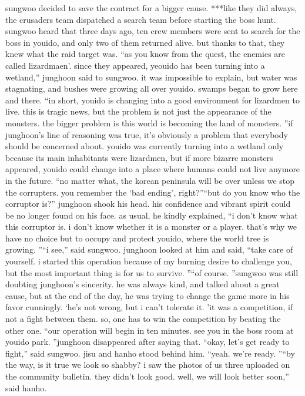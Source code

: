 sungwoo decided to save the contract for a bigger cause.
***like they did always, the crusaders team dispatched a search team before starting the boss hunt.
 sungwoo heard that three days ago, ten crew members were sent to search for the boss in youido, and only two of them returned alive.
 but thanks to that, they knew what the raid target was.
“as you know from the quest, the enemies are called lizardmaen’.
 since they appeared, yeouido has been turning into a wetland,” junghoon said to sungwoo.
it was impossible to explain, but water was stagnating, and bushes were growing all over youido.
 swamps began to grow here and there.
“in short, youido is changing into a good environment for lizardmen to live.
 this is tragic news, but the problem is not just the appearance of the monsters.
 the bigger problem is this world is becoming the land of monsters.
”if junghoon’s line of reasoning was true, it’s obviously a problem that everybody should be concerned about.
 youido was currently turning into a wetland only because its main inhabitants were lizardmen, but if more bizarre monsters appeared, youido could change into a place where humans could not live anymore in the future.
“no matter what, the korean peninsula will be over unless we stop the corrupters.
 you remember the ‘bad ending’, right?”“but do you know who the corruptor is?”
junghoon shook his head.
 his confidence and vibrant spirit could be no longer found on his face.
 as usual, he kindly explained, “i don’t know what this corruptor is.
 i don’t know whether it is a monster or a player.
 that’s why we have no choice but to occupy and protect youido, where the world tree is growing.
”“i see,” said sungwoo.
junghoon looked at him and said, “take care of yourself.
 i started this operation because of my burning desire to challenge you, but the most important thing is for us to survive.
”“of course.
”sungwoo was still doubting junghoon’s sincerity.
 he was always kind, and talked about a great cause, but at the end of the day, he was trying to change the game more in his favor cunningly.
‘he’s not wrong, but i can’t tolerate it.
’it was a competition, if not a fight between them.
 so, one has to win the competition by beating the other one.
“our operation will begin in ten minutes.
 see you in the boss room at youido park.
”junghoon disappeared after saying that.
“okay, let’s get ready to fight,” said sungwoo.
jisu and hanho stood behind him.
“yeah.
 we’re ready.
”“by the way, is it true we look so shabby? i saw the photos of us three uploaded on the community bulletin.
 they didn’t look good.
 well, we will look better soon,” said hanho.
